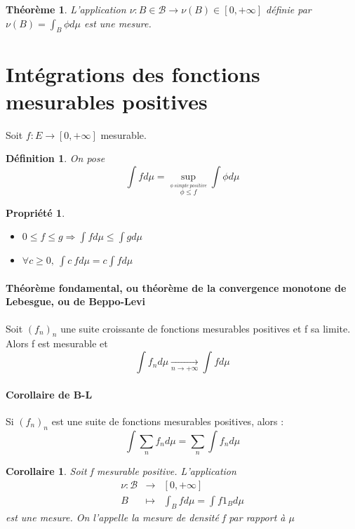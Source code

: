 \documentclass{article}
\theoremstyle{mes_theoremes}
\newtheorem{coro}{Corollaire}[section]
\newtheorem{theo}{Théorème}[section]
\newtheorem*{Def}{Définition}
\newtheorem{prop}{Propriété}[section]
\begin{document}
\begin{theo}
L'application $\nu : B\in \mathcal{B} \rightarrow \nu(B)\in [0,+\infty]$ définie par $\nu(B)=\int_B \phi d\mu$ est une mesure.
\end{theo}

\section{Intégrations des fonctions mesurables positives}
Soit $f : E \rightarrow [0,+\infty]$ mesurable.
\begin{Def}
On pose \[\int f d\mu = \sup_{\stackrel{\phi\ simple\ positive}{\phi \leq f}} \int \phi d\mu\]
\end{Def}

\begin{prop}
\begin{itemize}
\item $0 \leq f \leq g \Rightarrow \int fd\mu \leq \int g d\mu$
\item $\forall c \geq 0,\ \int c\ fd\mu = c\int f d\mu$
\end{itemize}
\end{prop}

\paragraph{Théorème fondamental, ou théorème de la convergence monotone de Lebesgue, ou de Beppo-Levi \\}
Soit $(f_n)_n$ une suite croissante de fonctions mesurables positives et f sa limite. Alors f est mesurable et \[\int f_n d\mu \xrightarrow[n\rightarrow +\infty]{} \int f d\mu\]

\paragraph{Corollaire de B-L \\}
Si $(f_n)_n$ est une suite de fonctions mesurables positives, alors : \[\int \sum_n f_n d\mu = \sum_n \int f_n d\mu\]

\begin{coro}
Soit f mesurable positive. L'application \begin{eqnarray*} \nu : \mathcal{B} &\rightarrow& [0,+\infty] \\ B &\mapsto& \int_B fd\mu = \int f 1_B d\mu \end{eqnarray*} est une mesure. On l'appelle la mesure de densité f par rapport à $\mu$
\end{coro}
\end{document}
